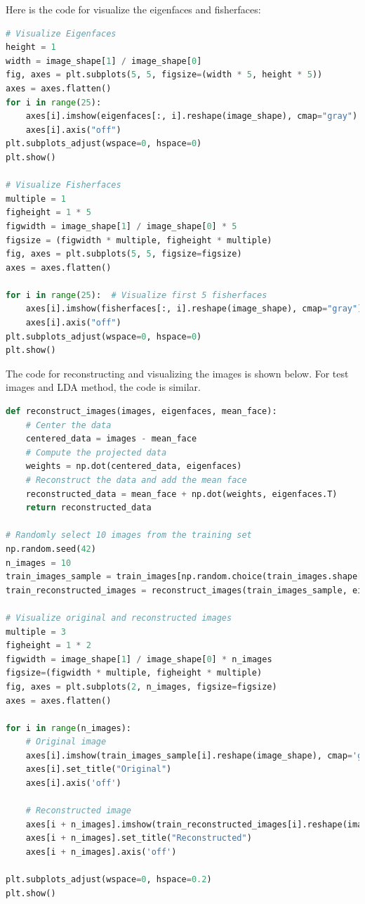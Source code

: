 \documentclass{homework}
\begin{document}
Here is the code for visualize the eigenfaces and fisherfaces:

\begin{lstlisting}[language=Python]
# Visualize Eigenfaces
height = 1
width = image_shape[1] / image_shape[0]
fig, axes = plt.subplots(5, 5, figsize=(width * 5, height * 5))
axes = axes.flatten()
for i in range(25):
    axes[i].imshow(eigenfaces[:, i].reshape(image_shape), cmap="gray")
    axes[i].axis("off")
plt.subplots_adjust(wspace=0, hspace=0)
plt.show()

# Visualize Fisherfaces
multiple = 1
figheight = 1 * 5
figwidth = image_shape[1] / image_shape[0] * 5
figsize = (figwidth * multiple, figheight * multiple)
fig, axes = plt.subplots(5, 5, figsize=figsize)
axes = axes.flatten()

for i in range(25):  # Visualize first 5 fisherfaces
    axes[i].imshow(fisherfaces[:, i].reshape(image_shape), cmap="gray")
    axes[i].axis("off")
plt.subplots_adjust(wspace=0, hspace=0)
plt.show()
\end{lstlisting}

The code for reconstructing and visualizing the images is shown below. For test images and LDA method, the code is similar.

\begin{lstlisting}[language=Python]
def reconstruct_images(images, eigenfaces, mean_face):
    # Center the data
    centered_data = images - mean_face
    # Compute the projected data
    weights = np.dot(centered_data, eigenfaces)
    # Reconstruct the data and add the mean face
    reconstructed_data = mean_face + np.dot(weights, eigenfaces.T)
    return reconstructed_data

# Randomly select 10 images from the training set
np.random.seed(42)
n_images = 10
train_images_sample = train_images[np.random.choice(train_images.shape[0], n_images, replace=False)]
train_reconstructed_images = reconstruct_images(train_images_sample, eigenfaces, mean_face)

# Visualize original and reconstructed images
multiple = 3
figheight = 1 * 2
figwidth = image_shape[1] / image_shape[0] * n_images
figsize=(figwidth * multiple, figheight * multiple)
fig, axes = plt.subplots(2, n_images, figsize=figsize)
axes = axes.flatten()

for i in range(n_images):
    # Original image
    axes[i].imshow(train_images_sample[i].reshape(image_shape), cmap='gray')
    axes[i].set_title("Original")
    axes[i].axis('off')
    
    # Reconstructed image
    axes[i + n_images].imshow(train_reconstructed_images[i].reshape(image_shape), cmap='gray')
    axes[i + n_images].set_title("Reconstructed")
    axes[i + n_images].axis('off')

plt.subplots_adjust(wspace=0, hspace=0.2)
plt.show() 
\end{lstlisting}
\end{document}
